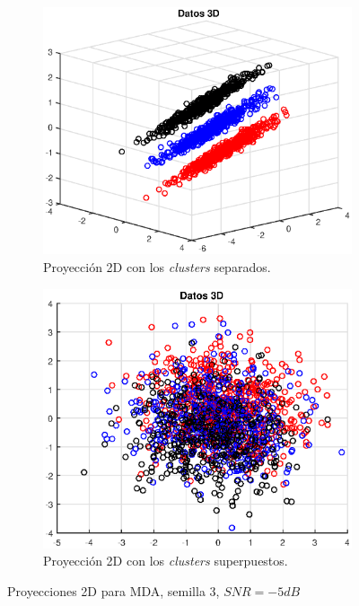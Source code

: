 \documentclass[11pt]{article} %
\begin{document}
\begin{figure}[h]
	\centering
	\begin{subfigure}[b]{0.435\textwidth}
		\includegraphics[width=\textwidth]{../21_seleccion/5_mda_m5dB_separadas.eps}
		\caption[]{\small Proyección 2D con los \emph{clusters} separados.}
		\label{fig:-5dB:mda_proj:separated}
	\end{subfigure}
	\quad
	\begin{subfigure}[b]{0.435\textwidth}
		\includegraphics[width=\textwidth]{../21_seleccion/51_mda_m5dB_superpuestas.eps}
		\caption[]{\small Proyección 2D con los \emph{clusters} superpuestos.}
		\label{fig:-5dB:mda_proj:overlapped}
	\end{subfigure}
	\caption{Proyecciones 2D para MDA, semilla 3, $SNR=-5dB$}
	\label{fig:-5dB:mda_proj}
\end{figure}
\end{document}
